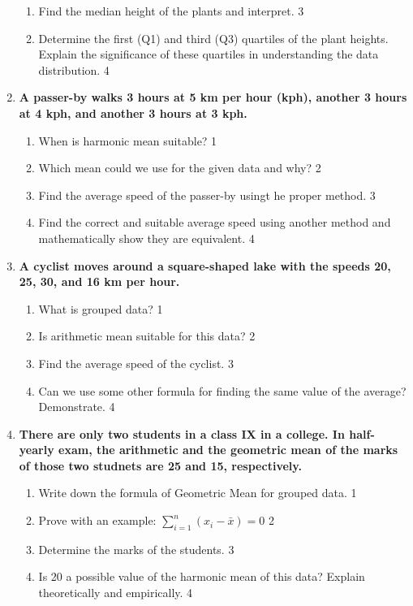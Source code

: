 \documentclass[a4paper,oneside]{book}
\begin{document}
\begin{enumerate}
\begin{enumerate}
    \item  
    Find the median height of the plants and interpret. \hfill 3
    \item
    Determine the first (Q1) and third (Q3) quartiles of the plant heights. Explain the significance of these quartiles in understanding the data distribution. \hfill 4
\end{enumerate}

  
   \item
	  \textbf{A passer-by walks 3 hours at 5 km per hour (kph), another 3 hours 
	  at 4 kph, and another 3 hours at 3 kph.} 
  
  \begin{enumerate}
    \item
	When is harmonic mean suitable? \hfill 1
    \item
	Which mean could we use for the given data and why? \hfill 2
    \item  
	Find the average speed of the passer-by usingt he proper method. \hfill 3
    \item
	Find the correct and suitable average speed using another method and mathematically show they are equivalent. \hfill 4
  \end{enumerate}

 \item
	  \textbf{A cyclist moves around a square-shaped lake with the speeds 20, 25, 30, and 16 km per hour.} 
  
  \begin{enumerate}
    \item
	What is grouped data? \hfill 1
    \item
	Is arithmetic mean suitable for this data? \hfill 2
    \item  
	Find the average speed of the cyclist. \hfill 3
    \item
	Can we use some other formula for finding the same value of the average? Demonstrate. \hfill 4
  \end{enumerate}
  
     \item
	  \textbf{There are only two students in a class IX in a college. In half-yearly exam, the arithmetic and the geometric mean of the marks of those two studnets are 25 and 15, respectively.} 
  
  \begin{enumerate}
    \item
	Write down the formula of Geometric Mean for grouped data. \hfill 1
	\item Prove with an example: $\displaystyle \sum_{i=1}^n (x_i-\bar x) = 0$ \hfill 2
    \item  
	Determine the marks of the students. \hfill 3
    \item
	Is 20 a possible value of the harmonic mean of this data? Explain theoretically and empirically. \hfill 4
  \end{enumerate}


\end{enumerate}
\end{document}
